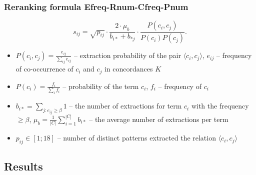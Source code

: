 \documentclass{beamer}
\begin{document}



 
 



\begin{frame}
\frametitle{Reranking formula Efreq-Rnum-Cfreq-Pnum}

  
$$s_{ij} = \sqrt{p_{ij}} \cdot \frac{2\cdot\mu_b }{b_{i*}+b_{*j}} \cdot \frac{P(c_i,c_j)}{P(c_i)P(c_j)}.$$


\begin{itemize}


\item $P(c_i,c_j)=\frac{e_{ij}}{\sum_{ij}e_{ij}}$ -- extraction probability of the pair $\langle c_i,c_j \rangle$, $e_{ij}$ --  frequency of co-occurrence of $c_i$ and $c_j$ in concordances $K$ 

\item $P(c_i)= \frac{f_i}{\sum_i f_i}$ -- probability of the term $c_i$, $f_i$ -- frequency of $c_i$ 
\item $b_{i*} = \sum_{j:e_{ij} \geq \beta} 1$ -- the number of extractions for term $c_i$ with the frequency $\geq \beta$, $\mu_b = \frac{1}{|C|}\sum_{i=1}^{|C|} b_{i*}$ -- the average number of extractions per term

\item $p_{ij} \in [1;18]$ -- number of distinct patterns extracted the relation $\langle c_i, c_j \rangle$
  
 
\end{itemize}

\end{frame}





\subsection{Results}
\end{document}
